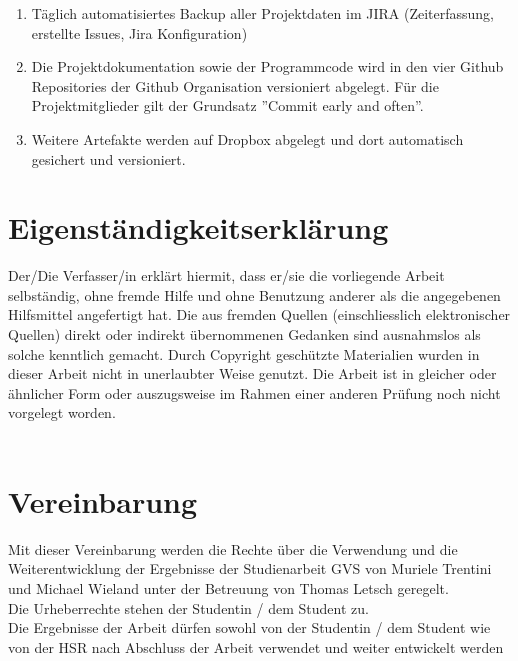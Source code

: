 \documentclass[11pt,a4paper,english,oneside]{book}
\numberwithin{equation}{chapter}
\begin{document}
	\begin{enumerate}
		\item Täglich automatisiertes Backup aller Projektdaten im JIRA \cite{jira} (Zeiterfassung, erstellte Issues, Jira Konfiguration)
		\item Die Projektdokumentation sowie der Programmcode wird in den vier Github Repositories der Github Organisation \cite{github} versioniert abgelegt. Für die Projektmitglieder gilt der Grundsatz ''Commit early and often''.
		\item Weitere Artefakte werden auf Dropbox \cite{dropbox} abgelegt und dort automatisch gesichert und versioniert.
	\end{enumerate}
	
	
	\newpage
	
	\appendix
	\noappendicestocpagenum
	\addappheadtotoc
	\appendixpage
	
	\printglossary
	\glsaddall
	
	\printbibliography[heading=bibintoc]
	
	\listoffigures
	
	\listoftables
	
	\chapter{Eigenständigkeitserklärung}
	Der/Die Verfasser/in erklärt hiermit, dass er/sie die vorliegende Arbeit selbständig, ohne fremde Hilfe und ohne Benutzung anderer als die angegebenen Hilfsmittel angefertigt hat. Die aus fremden Quellen (einschliesslich elektronischer Quellen) direkt oder indirekt übernommenen Gedanken sind ausnahmslos als solche kenntlich gemacht. Durch Copyright geschützte Materialien wurden in dieser Arbeit nicht in unerlaubter Weise genutzt. Die Arbeit ist in gleicher oder ähnlicher Form oder auszugsweise im Rahmen einer anderen Prüfung noch nicht vorgelegt worden.\\[2cm]
	 \hfill {}
	\hfill \\[2cm]
	 \hfill {}
	
	\chapter{Vereinbarung}
	
	Mit dieser Vereinbarung werden die Rechte über die Verwendung und die Weiterentwicklung der Ergebnisse der Studienarbeit GVS von Muriele Trentini und Michael Wieland unter der Betreuung von Thomas Letsch geregelt.\\
	Die Urheberrechte stehen der Studentin / dem Student zu.\\
	Die Ergebnisse der Arbeit dürfen sowohl von der Studentin / dem Student wie von der HSR nach Abschluss der Arbeit verwendet und weiter entwickelt werden\\[2cm]
	 \hfill {}
	\hfill \\[2cm]
	 \hfill {}
	
\end{document}
